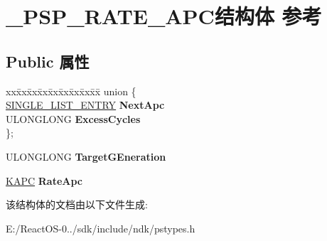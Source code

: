 \hypertarget{struct___p_s_p___r_a_t_e___a_p_c}{}\section{\+\_\+\+P\+S\+P\+\_\+\+R\+A\+T\+E\+\_\+\+A\+P\+C结构体 参考}
\label{struct___p_s_p___r_a_t_e___a_p_c}
\subsection*{Public 属性}
\begin{DoxyCompactItemize}
\item 
\mbox{\label{struct___p_s_p___r_a_t_e___a_p_c_adac2ac29930f418670e18132a5a79e5b}} 
\begin{tabbing}
xx\=xx\=xx\=xx\=xx\=xx\=xx\=xx\=xx\=\kill
union \{\\
\>\hyperlink{struct___s_i_n_g_l_e___l_i_s_t___e_n_t_r_y}{SINGLE\_LIST\_ENTRY} {\bfseries NextApc}\\
\>ULONGLONG {\bfseries ExcessCycles}\\
\}; \\

\end{tabbing}\item 
\mbox{\label{struct___p_s_p___r_a_t_e___a_p_c_a0453feff82c898c169471f3f92b09091}} 
U\+L\+O\+N\+G\+L\+O\+NG {\bfseries Target\+G\+Eneration}
\item 
\mbox{\label{struct___p_s_p___r_a_t_e___a_p_c_ae1825bd9fd662045f4db979c3393f32f}} 
\hyperlink{struct___k_a_p_c}{K\+A\+PC} {\bfseries Rate\+Apc}
\end{DoxyCompactItemize}


该结构体的文档由以下文件生成\+:\begin{DoxyCompactItemize}
\item 
E\+:/\+React\+O\+S-\/0../sdk/include/ndk/pstypes.\+h\end{DoxyCompactItemize}

